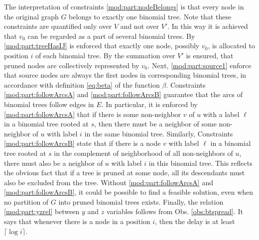 The interpretation of constraints \eqref{mod:part:nodeBelongs} is that every node in the original graph $G$ belongs to exactly one binomial tree.
Note that these constraints are quantified only over $V$ and not over $V'$.
In this way it is achieved that $v_0$ can be regarded as a part of several binomial trees.
By \eqref{mod:part:treeHasIJ} is enforced that exactly one node, possibly $v_0$, is allocated to position $i$ of each binomial tree.
By the summation over $V'$ is ensured, that pruned nodes are collectively represented by $v_0$.
Next, \eqref{mod:part:source1} enforce that source nodes are always the first nodes in corresponding binomial trees, in accordance with definition \eqref{eq:beta} of the function $\beta$.
Constraints \eqref{mod:part:followArcsA} and \eqref{mod:part:followArcsB} guarantee that the arcs of binomial trees follow edges in $E$.
In particular, it is enforced by \eqref{mod:part:followArcsA} that if there is some  non-neighbor $v$ of $u$  with a label $\ell$ in a binomial tree rooted at $s$,
then there must be a neighbor of some non-neighbor of $u$ with label $i$ in the same binomial tree.
Similarly, Constraints \eqref{mod:part:followArcsB} state that if there is a node $v$ with label $\ell$ in a binomial tree rooted at $s$ in the complement of neighborhood of all non-neighbors of $u$,
there must also be a neighbor of $u$ with label $i$ in this binomial tree.
This reflects the obvious fact that if a tree is pruned at some node, all its descendants must also be excluded from the tree.
Without \eqref{mod:part:followArcsA} and \eqref{mod:part:followArcsB}, it could be possible to find a feasible solution, even when no partition of $G$ into pruned binomial trees exists.
Finally, the relation \eqref{mod:part:yzrel} between $y$ and $z$ variables follows from Obs. \ref{obs:btspread}.
It says that whenever there is a node in a position $i$, then the delay is at least $\lceil\log i\rceil$.
%
